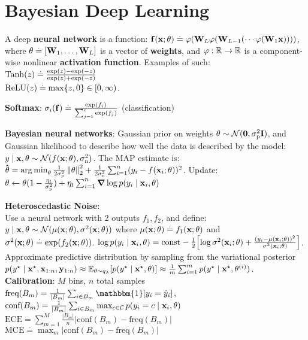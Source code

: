 \section{Bayesian Deep Learning}
\begin{framed}
    A deep \textbf{neural network} is a function: $\mathbf{f}(\mathbf{x}; \mathbf{\theta}) \overset{.}{=} \mathbf{\varphi}(\mathbf{W}_L \mathbf{\varphi}(\mathbf{W}_{L-1} ( \cdots \mathbf{\varphi}(\mathbf{W}_1 \mathbf{x}))))$, where $\mathbf{\theta} \overset{.}{=} [\mathbf{W}_1, \dots, \mathbf{W}_L]$ is a vector of \textbf{weights}, and $\varphi : \mathbb{R} \to \mathbb{R}$ is a component-wise nonlinear \textbf{activation function}. Examples of such: \\
    $\mathrm{Tanh}(z) \overset{.}{=} \frac{\exp(z) - \exp(-z)}{\exp(z) + \exp(-z)}$ \\
    $\mathrm{ReLU}(z) \overset{.}{=} \max \{z, 0\} \in [0, \infty)$.
\end{framed}
\textbf{Softmax}: $\sigma_i(\mathbf{f}) \overset{.}{=} \frac{\exp(f_i)}{\sum_{j=1}^c \exp(f_j)}$ (classification)
\begin{framed}
    \textbf{Bayesian neural networks}: Gaussian prior on weights $\vtheta \sim \N{\vzero}{\sigmap^2 \mI}$, and Gaussian likelihood to describe how well the data is described by the model: \\
    $y \mid \vx, \vtheta \sim \N{f(\vx; \vtheta)}{\sigman^2}$. The MAP estimate is: \\
    $\vthetahat = \argmin_\vtheta \frac{1}{2 \sigmap^2} \norm{\vtheta}_2^2 + \frac{1}{2 \sigman^2} \sum_{i=1}^n (y_i - f(\vx_i; \vtheta))^2$. Update: $\vtheta \gets \vtheta(1 - \frac{\eta_t}{\sigmap^2}) + \eta_t \sum_{i=1}^n \grad \log p(y_i \mid \vx_i, \vtheta)$
\end{framed}
\textbf{Heteroscedastic Noise}:\\ Use a neural network with 2 outputs $f_1, f_2$, and define: $y \mid \vx, \vtheta \sim \N{\mu(\vx; \vtheta)}{\sigma^2(\vx; \vtheta)}$ where $\mu(\mathbf{x}; \mathbf{\theta}) \overset{.}{=} f_1(\mathbf{x}; \mathbf{\theta})$ and $\sigma^2(\mathbf{x}; \mathbf{\theta}) \overset{.}{=} \exp(f_2(\mathbf{x}; \mathbf{\theta}))$.
$\log p(y_i \mid \vx_i, \vtheta) = \const - \frac{1}{2} \brackets*{\log \sigma^2(\vx_i; \vtheta) + \frac{(y_i - \mu(\vx_i; \vtheta))^2}{\sigma^2(\vx_i; \vtheta)}}$.
Approximate predictive distribution by sampling from the variational posterior $p(\ys \mid \vxs, \vx_{1:n}, \vy_{1:n}) \approx \E[\theta \sim q_\vlambda]{p(\ys \mid \vxs, \vtheta)}\approx \frac{1}{m} \sum_{i=1}^m p(\ys \mid \vxs, \vtheta^{(i)})$. \\
\textbf{Calibration}: $M$ bins, $n$ total samples \\
$\textrm{freq}(B_m)= \frac{1}{|B_m|} \sum_{i \in B_m} \mathbbm{1}[y_i = \hat{y}_i]$, $\textrm{conf}(B_m) = \frac{1}{|B_m|} \sum_{i \in B_m} \max_{c \in \mathcal{C}} p(y_i = c \mid \mathbf{x}_i, \mathbf{\theta})$ \\
$\textrm{ECE} \stackrel{\cdot}{=} \sum_{m=1}^M \frac{|B_m|}{n} |\textrm{conf}(B_m) - \textrm{freq}(B_m)|$ \\
$\textrm{MCE} \stackrel{\cdot}{=} \max_{m} |\textrm{conf}(B_m) - \textrm{freq}(B_m)|$ \\